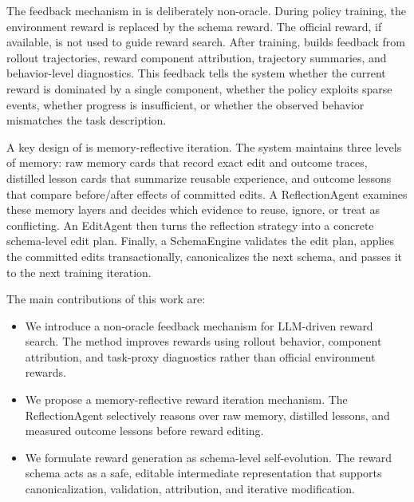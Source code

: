 The feedback mechanism in \methodname{} is deliberately non-oracle. During policy training, the environment reward is replaced by the schema reward. The official reward, if available, is not used to guide reward search. After training, \methodname{} builds feedback from rollout trajectories, reward component attribution, trajectory summaries, and behavior-level diagnostics. This feedback tells the system whether the current reward is dominated by a single component, whether the policy exploits sparse events, whether progress is insufficient, or whether the observed behavior mismatches the task description.

A key design of \methodname{} is memory-reflective iteration. The system maintains three levels of memory: raw memory cards that record exact edit and outcome traces, distilled lesson cards that summarize reusable experience, and outcome lessons that compare before/after effects of committed edits. A ReflectionAgent examines these memory layers and decides which evidence to reuse, ignore, or treat as conflicting. An EditAgent then turns the reflection strategy into a concrete schema-level edit plan. Finally, a SchemaEngine validates the edit plan, applies the committed edits transactionally, canonicalizes the next schema, and passes it to the next training iteration.

The main contributions of this work are:
\begin{itemize}
    \item We introduce a non-oracle feedback mechanism for LLM-driven reward search. The method improves rewards using rollout behavior, component attribution, and task-proxy diagnostics rather than official environment rewards.
    \item We propose a memory-reflective reward iteration mechanism. The ReflectionAgent selectively reasons over raw memory, distilled lessons, and measured outcome lessons before reward editing.
    \item We formulate reward generation as schema-level self-evolution. The reward schema acts as a safe, editable intermediate representation that supports canonicalization, validation, attribution, and iterative modification.
\end{itemize}
